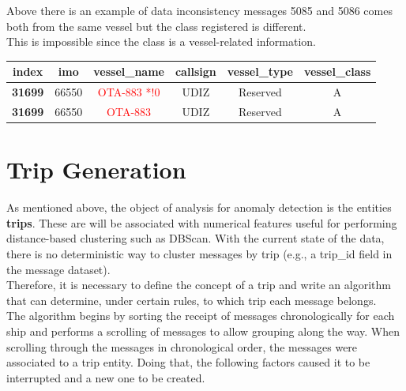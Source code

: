     Above there is an example of data inconsistency messages 5085 and 5086 comes both from the same vessel but the class registered is different.
    \\
    This is impossible since the class is a vessel-related information.
    
    
    \bigbreak
    
    \begin{tabular}{|c|c|c|c|c|c|}
        \hline
            \textbf{index} & \textbf{imo} & \textbf{vessel\_name} & \textbf{callsign} & \textbf{vessel\_type} & \textbf{vessel\_class} \\
        \hline
            \textbf{31699} & 66550      & \textcolor{red}{OTA-883 *!0}   & UDIZ              & Reserved               & A      \\
            \textbf{31699} & 66550      & \textcolor{red}{OTA-883}   & UDIZ              & Reserved               & A      \\
        \hline
    \end{tabular}

\clearpage
\section{Trip Generation}

    As mentioned above, the object of analysis for anomaly detection is the entities \textbf{trips}. These are will be associated with numerical features useful for performing distance-based clustering such as DBScan. With the current state of the data, there is no deterministic way to cluster messages by trip (e.g., a trip\_id field in the message dataset).
    \\
    Therefore, it is necessary to define the concept of a trip and write an algorithm that can determine, under certain rules, to which trip each message belongs.
    \\
    The algorithm begins by sorting the receipt of messages chronologically for each ship and performs a scrolling of messages to allow grouping along the way.
    When scrolling through the messages in chronological order, the messages were associated to a trip entity. Doing that, the following factors caused it to be interrupted and a new one to be created.
    
